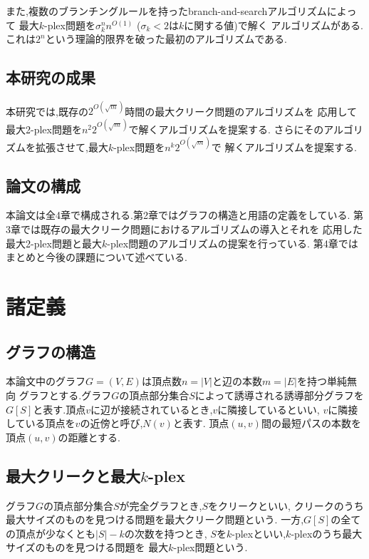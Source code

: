 \documentclass{thesis}
\theoremstyle{definition}
\begin{document}
また,複数のブランチングルールを持ったbranch-and-searchアルゴリズムによって
最大$k$-plex問題を$\sigma_{k}^{n}n^{O(1) }$ ($\sigma_{k} < 2$は$k$に関する値)で解く
アルゴリズムがある.これは$2^{n}$という理論的限界を破った最初のアルゴリズムである. \cite{xiao2017fast} 

\section{本研究の成果}
本研究では,既存の$2^{O(\sqrt{m})}$時間の最大クリーク問題のアルゴリズムを
応用して最大2-plex問題を$n^{2}2^{O(\sqrt{m})}$で解くアルゴリズムを提案する.
さらにそのアルゴリズムを拡張させて,最大$k$-plex問題を$n^{k }2^{O(\sqrt{m})}$で
解くアルゴリズムを提案する.

\section{論文の構成}
本論文は全4章で構成される.第2章ではグラフの構造と用語の定義をしている.
第3章では既存の最大クリーク問題におけるアルゴリズムの導入とそれを
応用した最大2-plex問題と最大$k$-plex問題のアルゴリズムの提案を行っている.
第4章ではまとめと今後の課題について述べている.

\newpage

\chapter{諸定義}

\section{グラフの構造}
本論文中のグラフ$G=(V,E)$は頂点数$n=|V|$と辺の本数$m=|E|$を持つ単純無向
グラフとする.グラフ$G$の頂点部分集合$S$によって誘導される誘導部分グラフを
$G[S]$と表す.頂点$v$に辺が接続されているとき,$v$に隣接しているといい,
$v$に隣接している頂点を$v$の近傍と呼び,$N(v)$と表す.
頂点$(u,v)$間の最短パスの本数を頂点$(u,v)$の距離とする.

\section{最大クリークと最大$k$-plex}
グラフ$G$の頂点部分集合$S$が完全グラフとき,$S$をクリークといい,
クリークのうち最大サイズのものを見つける問題を最大クリーク問題という.
一方,$G[S]$の全ての頂点が少なくとも$|S| - k$の次数を持つとき,
$S$を$k$-plexといい,$k$-plexのうち最大サイズのものを見つける問題を
最大$k$-plex問題という.
\end{document}
